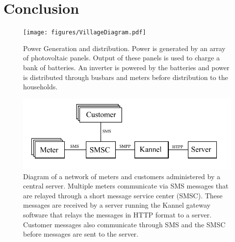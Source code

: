 \documentclass[conference]{IEEEtran}
\begin{document}
\section{Conclusion}


\begin{figure}[]
\begin{center}
\texttt{[image: figures/VillageDiagram.pdf]}
\end{center}
\caption{Power Generation and distribution.
Power is generated by an array of photovoltaic panels.
Output of these panels is used to charge a bank of batteries.
An inverter is powered by the batteries and power is distributed
through busbars and meters before distribution to the households.}
\label{ShedWiringDiagram}
\end{figure}


\begin{figure}[]
\begin{center}
\includegraphics[width=\columnwidth]{figures/NetworkDiagram.pdf}
\end{center}
\caption{Diagram of a network of meters and customers administered by a central server.
Multiple meters communicate via SMS messages that are relayed through a short message
service center (SMSC).  These messages are received by a server running the Kannel gateway
software that relays the messages in HTTP format to a server.  Customer messages also
communicate through SMS and the SMSC before messages are sent to the server.}
\label{NetworkDiagram}
\end{figure}
\end{document}
